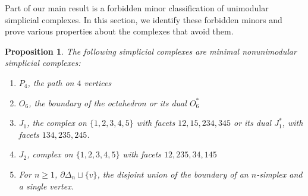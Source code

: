 \documentclass[letterpaper,12pt]{amsart}
\theoremstyle{plain}
\newtheorem{prop}[thm]{Proposition}
\theoremstyle{definition}
\theoremstyle{remark}
\begin{document}
Part of our main result is a forbidden minor classification of unimodular simplicial complexes.
In this section, we identify these forbidden minors and prove various properties about the complexes that avoid them.

\begin{prop}\label{prop:badcomplexes}
The following simplicial complexes are minimal nonunimodular simplicial complexes:
	\begin{enumerate}
		\item $P_4$, the path on $4$ vertices
		\item $O_6$, the boundary of the octahedron or its dual $O_6^*$
		\item $J_1$, the complex on $\{1,2,3,4,5\}$ with facets $12,15,234,345$ or its 
		dual $J_1^*$, with facets $134, 235, 245$.
		\item $J_2$, complex on $\{1,2,3,4,5\}$ with facets $12,235,34,145$
		\item For $n \ge 1$, $\partial\Delta_n \sqcup \{v\}$, the disjoint union of the boundary of an $n$-simplex and a single vertex.
	\end{enumerate}
	

\end{prop}
\end{document}
